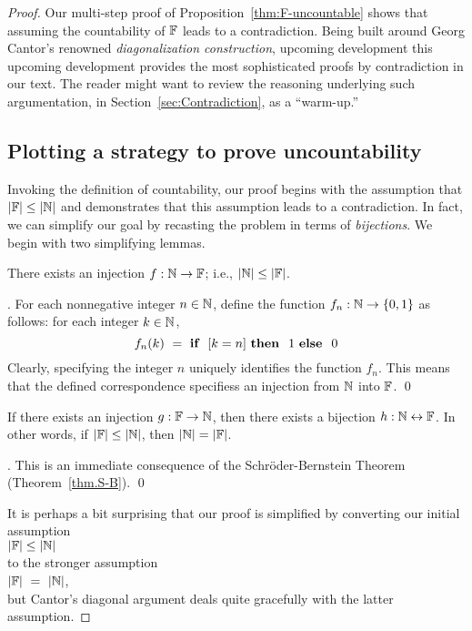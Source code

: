 \begin{proof}
Our multi-step proof of Proposition~\ref{thm:F-uncountable} shows that
assuming the countability of $\mathbb{F}$ leads to a contradiction.  Being
built around Georg Cantor's renowned {\it diagonalization
  construction}, upcoming development
 this upcoming development provides
the most sophisticated proofs by contradiction in our text.  The
reader might want to review the reasoning underlying such
argumentation, in Section~\ref{sec:Contradiction}, as a ``warm-up.''

\subsection{Plotting a strategy to prove uncountability}
\label{sec:the-diag-strategy}

Invoking the definition of countability, our proof begins with the
assumption that $|\mathbb{F}| \leq |\mathbb{N}|$ and demonstrates that this assumption
leads to a contradiction.  In fact, we can simplify our goal by
recasting the problem in terms of {\em bijections}.  We begin with two
simplifying lemmas.

\begin{lemma}
\label{lem:N-leq-F}
There exists an injection $f: \mathbb{N} \rightarrow \mathbb{F}$; i.e., $|\mathbb{N}| \leq
|\mathbb{F}|$.
\end{lemma}

.
For each nonnegative integer $n \in \mathbb{N}$, define the function $f_n: \mathbb{N}
\rightarrow \{0,1\}$ as follows: for each integer $k \in \mathbb{N}$,
\[ f_n(k) \ = \ \mbox{\bf if } \ [k=n] \ \mbox{\bf then } \ 1
\ \mbox{\bf else } \ 0
\]
Clearly, specifying the integer $n$ uniquely identifies the function
$f_n$.  This means that the defined correspondence specifiess an
injection from $\mathbb{N}$ into $\mathbb{F}$.  \qed

\begin{lemma}
\label{lem:N-=-F}
If there exists an injection $g: \mathbb{F} \rightarrow \mathbb{N}$, then there exists
a bijection $h: \mathbb{N} \leftrightarrow \mathbb{F}$.  In other words, if $|\mathbb{F}| \leq
|\mathbb{N}|$, then $|\mathbb{N}| = |\mathbb{F}|$.
\end{lemma}

.
This is an immediate consequence of the Schr\"{o}der-Bernstein Theorem
(Theorem~\ref{thm.S-B}).  \qed

\medskip

It is perhaps a bit surprising that our proof is simplified by
converting our initial assumption \\
\hspace*{.35in}$|\mathbb{F}| \leq |\mathbb{N}|$ \\
to the stronger assumption \\
\hspace*{.35in}$|\mathbb{F}| \ = \ |\mathbb{N}|$,  \\
but Cantor's diagonal argument deals quite gracefully with the latter
assumption.


\end{proof}
